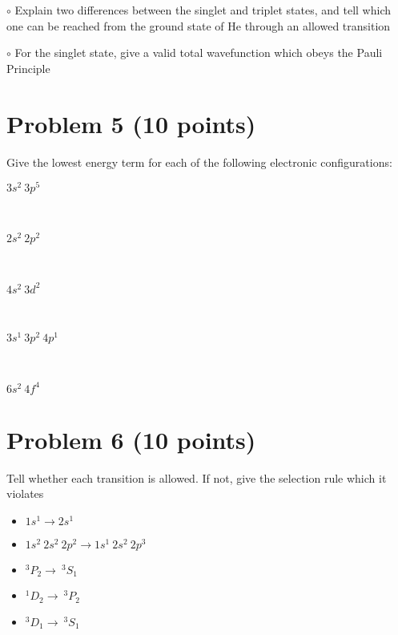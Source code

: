 \documentclass[10pt, letterpaper]{memoir}
\begin{document}
	\noindent $\circ$ Explain two differences between the singlet and triplet states, and tell which one can be reached from the ground state of He through an allowed transition
	
	
	
	\vspace{20em}
	\noindent $\circ$ For the singlet state, give a valid total wavefunction which obeys the Pauli Principle
	
	\newpage
	\section*{Problem 5 (10 points)}
	Give the lowest energy term for each of the following electronic configurations:
	
	\begin{description}
		\item[$3s^2~3p^5$]~
		
		\vspace{4em}
		\item[$2s^2~2p^2$] ~
		
		\vspace{4em}
		\item[$4s^2~3d^2$] ~
		
		\vspace{4em}
		\item[$3s^1~3p^2~4p^1$] ~
				
		\vspace{4em}
		\item[$6s^2~4f^4$]
	\end{description}
	
	\vspace{3em}
	\section*{Problem 6 (10 points)}
	Tell whether each transition is allowed. If not, give the selection rule which it violates
	
	\begin{itemize}
		\item $1s^1\rightarrow2s^1$
		
		\vspace{4em}
		\item $1s^2~2s^2~2p^2\rightarrow 1s^1~2s^2~2p^3$
		
		\vspace{4em}
		\item $^3P_2 \rightarrow ~ ^3S_1$
		
		\vspace{4em}
		\item $^1D_2 \rightarrow ~ ^3P_2$
		
		\vspace{4em}
		\item $^3D_1 \rightarrow ~ ^3S_1$
	\end{itemize}
\end{document}
